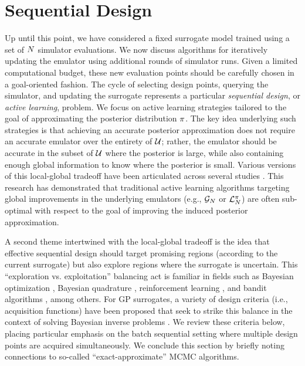 \documentclass[12pt]{article}
\begin{document}
\section{Sequential Design} \label{sec:seq-design}
Up until this point, we have considered a fixed surrogate model trained using a set of
$\Ndesign$ simulator evaluations. We now discuss algorithms for iteratively 
updating the emulator using additional rounds of simulator runs.
Given a limited computational budget, these new evaluation points should be carefully chosen in 
a goal-oriented fashion. The cycle of selecting design points, querying the simulator, 
and updating the surrogate represents a particular \textit{sequential design},
or \textit{active learning}, problem. We focus on active learning strategies
tailored to the goal of approximating the posterior distribution $\postDens$. The key
idea underlying such strategies is that achieving an accurate posterior 
approximation does not require an accurate emulator over the entirety of $\parSpace$;
rather, the emulator should be accurate in the subset of $\parSpace$ where the 
posterior is large, while also containing enough global information to know where
the posterior is small. Various versions of this local-global tradeoff have been articulated
across several studies \citep{StuartTeck2, gp_surrogates_random_exploration,SinsbeckNowak,Surer2023sequential,adaptiveMultimodal}. 
This research has demonstrated that traditional active learning algorithms targeting global improvements 
in the underlying emulators (e.g., $\fwdEm[\Ndesign]$ or $\lpostEm[\Ndesign]$) are often sub-optimal with 
respect to the goal of improving the induced posterior approximation.

A second theme intertwined with the local-global tradeoff is the idea that effective 
sequential design should target promising regions (according to the current surrogate)
but also explore regions where the surrogate is uncertain. 
This ``exploration vs. exploitation'' balancing act is familiar in fields such as 
Bayesian optimization \citep{reviewBayesOpt}, Bayesian quadrature 
\citep{BayesQuadrature,BayesQuadratureAL,BayesQuadRatios,quadratureLogGP}, 
reinforcement learning \citep{BadiaRL,LiuRL}, and bandit algorithms \citep{banditsEmpirical,LattimoreBandits}, 
among others. For GP surrogates, a variety of design criteria (i.e., acquisition functions) have been 
proposed that seek to strike this balance in the context of solving Bayesian inverse problems \citep{SinsbeckNowak,Surer2023sequential,KandasamyActiveLearning2015,weightedIVAR,
VehtariParallelGP,VillaniAdaptiveGP}. We review these criteria below, placing particular 
emphasis on the batch sequential setting where multiple design points are acquired simultaneously.
We conclude this section by briefly noting connections to so-called ``exact-approximate'' MCMC algorithms.
\end{document}
